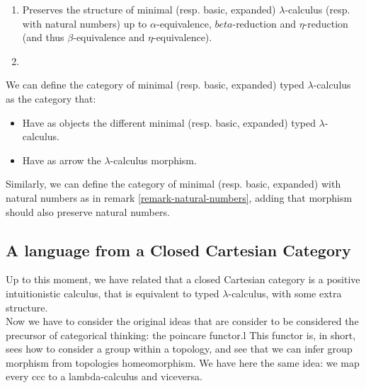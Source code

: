 \begin{definition}
\begin{definition}
\begin{enumerate}
  \item Preserves the structure of minimal (resp. basic, expanded) $\lambda$-calculus (resp. with natural numbers) up to $\alpha$-equivalence, $beta$-reduction and $\eta$-reduction (and thus $\beta$-equivalence and $\eta$-equivalence).

  \item 
\end{enumerate}
\end{definition}


\begin{definition}
  We can define the category of minimal (resp. basic, expanded) typed $\lambda$-calculus  as the category that:
  \begin{itemize}
  \item Have as objects the different minimal (resp. basic, expanded) typed $\lambda$-calculus.
  \item Have as arrow the $\lambda$-calculus morphism.
  \end{itemize}
  Similarly, we can define the category of minimal (resp. basic, expanded) with natural numbers as in remark \ref{remark-natural-numbers}, adding that morphism should also preserve natural numbers.
\end{definition}

\subsection{A language from a Closed Cartesian Category}

Up to this moment, we have related that a closed Cartesian category is a positive intuitionistic calculus, that is equivalent to  typed $\lambda$-calculus, with some extra structure.\\

Now we have to consider the original ideas that are consider to be considered the precursor of categorical thinking: the poincare functor.l This functor is, in short,  sees how to consider a group within a topology, and see that we can infer group morphism from topologies homeomorphism. We have here the same idea: we map every ccc to a lambda-calculus and viceversa.\\ 




\end{definition}
